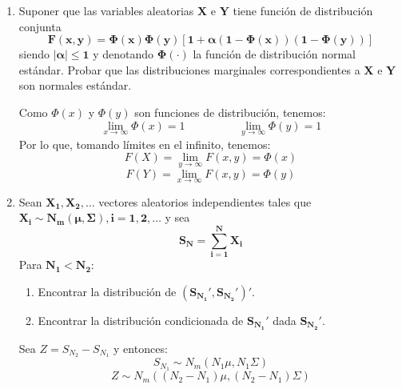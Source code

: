\documentclass[11pt,a4paper]{article}
\begin{document}
\begin{enumerate}[label=\arabic*.]
\newpage
\bfseries
\item Suponer que las variables aleatorias $\mathbf{X}$ e $\mathbf{Y}$ tiene función de distribución conjunta
$$\mathbf{F(x, y) = \Phi(x)\Phi(y)[1 + \alpha(1 - \Phi(x))(1 - \Phi(y))]}$$
siendo $\mathbf{|\alpha| \leq 1}$ y denotando $\mathbf{\Phi(\cdot)}$ la función de distribución normal estándar. Probar que las distribuciones marginales correspondientes a $\mathbf{X}$ e $\mathbf{Y}$ son normales estándar.
\vspace{0.5cm}
\normalfont

Como $\Phi(x)$ y $\Phi(y)$ son funciones de distribución, tenemos:
$$\lim\limits_{x \to \infty} \Phi(x) = 1 \hspace{2cm} \lim\limits_{y \to \infty} \Phi(y) = 1$$
Por lo que, tomando límites en el infinito, tenemos:
$$F(X) = \lim\limits_{y \to \infty} F(x, y) = \Phi(x)$$
$$F(Y) = \lim\limits_{x \to \infty} F(x, y) = \Phi(y)$$

\newpage
\bfseries
\item Sean $\mathbf{X_{1}, X_{2}, \dots}$ vectores aleatorios independientes tales que $\mathbf{X_{i} \sim N_{m}(\mu, \Sigma), i = 1, 2, \dots}$ y sea
$$\mathbf{S_{N} = \sum_{i=1}^{N}X_{i}}$$
Para $\mathbf{N_{1} < N_{2}}$:
\begin{enumerate}[label=\alph*)]
\item Encontrar la distribución de $\mathbf{(S_{N_{1}}', S_{N_{2}}')'}$.
\item Encontrar la distribución condicionada de $\mathbf{S_{N_{1}}'}$ dada $\mathbf{S_{N_{2}}'}$.
\end{enumerate}
\vspace{0.5cm}
\normalfont

Sea $Z = S_{N_{2}} - S_{N_{1}}$ y entonces:
$$S_{N_{1}} \sim N_{m}(N_{1}\mu, N_{1}\Sigma)$$
$$Z \sim N_{m}((N_{2} - N_{1}) \mu, (N_{2} - N_{1}) \Sigma)$$


\end{enumerate}
\end{document}
